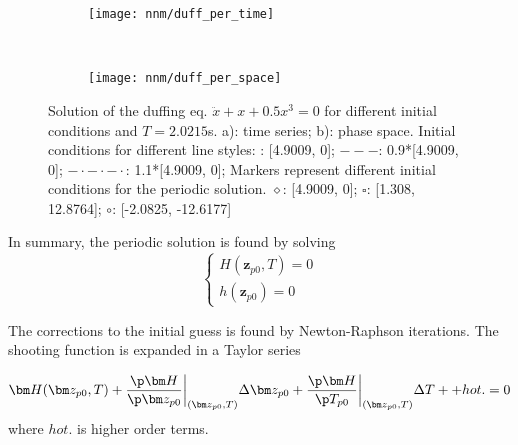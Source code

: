 \begin{figure}[!ht]
  \centering
  \begin{subfigure}[b]{0.45\textwidth}
    \texttt{[image: nnm/duff\_per\_time]}
  \end{subfigure}
  ~
  \begin{subfigure}[b]{0.45\textwidth}
    \texttt{[image: nnm/duff\_per\_space]}
  \end{subfigure}
  \caption{Solution of the duffing eq. $\ddot x + x + 0.5x^3=0$ for different
    initial conditions and $T=2.0215$s. a): time series; b):
    phase space.
    Initial conditions for different line styles:
    \textemdash: [4.9009, 0];
    $---$: 0.9*[4.9009, 0];
    $-\cdot -\cdot-\cdot$: 1.1*[4.9009, 0];
    Markers represent different initial conditions for the periodic solution.
    $\diamond$: [4.9009, 0];
    $\square$: [1.308, 12.8764];
    $\circ$: [-2.0825, -12.6177]
  }
  \label{fig:sm_phase}
\end{figure}


In summary, the periodic solution is found by solving
\begin{equation}
  \label{eq:sm_bvp_problem}
  \begin{cases}
    H(\bm z_{p0}, T) = 0 \\
    h(\bm z_{p0} ) = 0
  \end{cases}
\end{equation}

The corrections to the initial guess is found by Newton-Raphson iterations. The
shooting function is expanded in a Taylor series

\begin{equation}
  \label{eq:sm_nr}
  \bm H(\bm z_{p0},T) +
  \frac{\p \bm H}{\p \bm z_{p0}}\bigg|_{(\bm z_{p0},T)} \Delta \bm z_{p0} +
  \frac{\p \bm H}{\p T_{p0}}\bigg|_{(\bm z_{p0},T)} \Delta T +
  + hot. = 0
\end{equation}
where $hot.$ is higher order terms.


